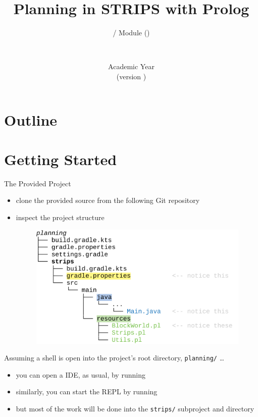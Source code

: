 \documentclass[presentation]{beamer}\mode<presentation>{\usetheme{AMSBolognaFC}}
\title[\currentLab{} -- STRIPS in Prolog]{Planning in STRIPS with Prolog}
\subtitle{\courseName{} / Module \moduleN{} (\courseAcronym)}
\author[\sspeaker{\gcShort}]{\speaker{\gcFull} \\ \gcEmail}
\institute[\disiShort, \uniboShort]{\disi{} (\disiShort)\\\unibo}
\date[A.Y. \academicYear{} (v.\ \version)]{Academic Year \academicYear{}\\(version \version)}
\begin{document}

\frame{\titlepage}

\section*{Outline}
%
\frame[c]{\tableofcontents[hideallsubsections]}

\section{Getting Started}

\begin{frame}[c,allowframebreaks]{The Provided Project}

\begin{itemize}
    \item clone the provided source from the following Git repository
    \begin{center}
    \end{center}
    \item inspect the project structure
    \begin{figure}
        \centering
        \includegraphics[width=.7\linewidth]{figures/treestructre.pdf}
    \end{figure}
\end{itemize}
%
\framebreak
%
Assuming a shell is open into the project's root directory, \texttt{planning/} \ldots
%
%
\begin{itemize}
    \item you can open a \tuprolog{} IDE, as usual, by running
    \item similarly, you can start the \tuprolog{} REPL by running
    \item but most of the work will be done into the \alert{\texttt{strips/}} subproject and directory
\end{itemize}
\end{frame}
\end{document}
